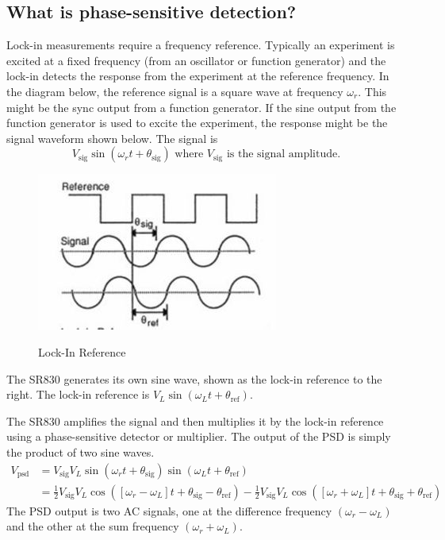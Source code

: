 \documentclass{../lab}
\begin{document}
\subsection{What is phase-sensitive detection?}

Lock-in measurements require a frequency reference. Typically an experiment is excited at a fixed frequency (from an oscillator or function generator) and the lock-in detects the response from the experiment at the reference frequency. In the diagram below, the reference signal is a square wave at frequency $\omega_r$. This might be the sync output from a function generator. If the sine output from the function generator is used to excite the experiment, the response might be the signal waveform shown below. The signal is
\[
    V_\text{sig}\sin(\omega_rt + \theta_\text{sig}) \text{ where } V_\text{sig} \text{ is the signal amplitude.}
\]

\begin{figure}[h]
    \centering
    \href{http://experimentationlab.berkeley.edu/sites/default/files/images/300px-NMR33.jpg}{\includegraphics[width=0.5\linewidth]{images/300px-NMR33.jpg}}
    \caption{Lock-In Reference}
    \label{fig:300px-NMR33}
\end{figure}

The SR830 generates its own sine wave, shown as the lock-in reference to the right. The lock-in reference is $V_L \sin(\omega_Lt + \theta_\text{ref})$.

The SR830 amplifies the signal and then multiplies it by the lock-in reference using a phase-sensitive detector or multiplier. The output of the PSD is simply the product of two sine waves.
\begin{align*}
    V_\text{psd} &= V_\text{sig} V_L \sin (\omega_rt + \theta_\text{sig}) \sin (\omega_Lt + \theta_\text{ref}) \\
    &= \frac{1}{2} V_\text{sig} V_L \cos ([\omega_r - \omega_L ]t + \theta_\text{sig} - \theta_\text{ref}) - \frac{1}{2} V_\text{sig} V_L \cos ([\omega_r + \omega_L ]t + \theta_\text{sig} + \theta_\text{ref})
\end{align*}
The PSD output is two AC signals, one at the difference frequency $(\omega_r - \omega_L)$ and the other at the sum frequency $(\omega_r + \omega_L)$.
\end{document}

